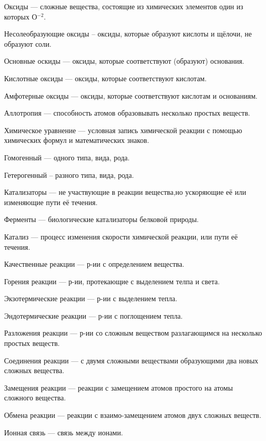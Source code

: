 \documentclass[a4paper, 12pt]{article}
\begin{document}
        Оксиды --- сложные вещества, состоящие из химических элементов один из которых О$^{-2}$.
        
        Несолеобразующие оксиды -- оксиды, которые образуют кислоты и щёлочи, не образуют соли.
        
        Основные оскиды --- оксиды, которые соответствуют (образуют) основания.
        
        Кислотные оксиды --- оксиды, которые соответствуют кислотам.

       	Амфотерные оксиды --- оксиды, которые соответствуют кислотам и основаниям.
        
        Аллотропия --- способность атомов образовывать несколько простых веществ.
        
        Химическое уравнение --- условная запись химической реакции с помощью химических формул и математических знаков.

        Гомогенный --- одного типа, вида, рода.

        Гетерогенный -- разного типа, вида, рода.

        Катализаторы --- не участвующие в реакции вещества,но ускоряющие её или изменяющие пути её течения.

        Ферменты --- биологические катализаторы белковой природы.

        Катализ --- процесс изменения скорости химической реакции, или пути её течения.
        
        Качественные реакции --- р-ии с определением вещества.
        
        Горения реакции --- р-ии, протекающие с выделением телпа и света.
      
        Экзотермические реакции --- р-ии с выделением тепла.
        
        Эндотермические реакции --- р-ии с поглощением тепла.
        
        Разложения реакции --- р-ии со сложным веществом разлагающимся на несколько простых веществ.
        
        Соединения реакции --- с двумя сложными веществами образующими два новых сложных вещества.
        
        Замещения реакции --- реакции с замещением атомов простого на атомы сложного вещества.
        
        Обмена реакции --- реакции с взаимо-замещением атомов двух сложных веществ.
        
        Ионная связь --- связь между ионами.
        
\end{document}
